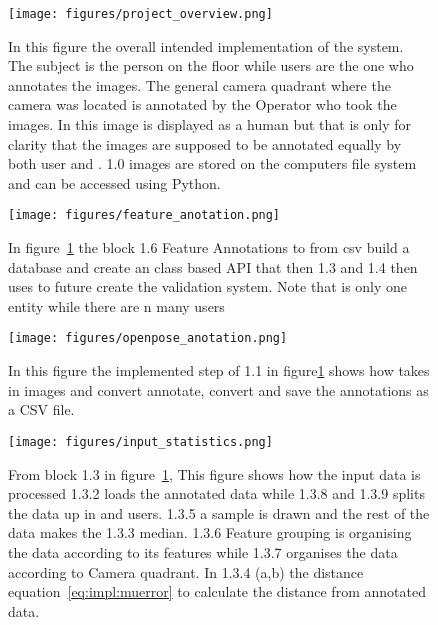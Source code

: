 \begin{figure}[ht]
\begin{center}
    \texttt{[image: figures/project\_overview.png]}
\end{center}
\caption[Project Overview]{In this figure the overall intended implementation of the system. The subject is the person on the floor while users are the one who annotates the images. The general camera quadrant where the camera was located is annotated by the Operator who took the images. In this image \openpose is displayed as a human but that is only for clarity that the images are supposed to be annotated equally by both user and \openpose. 1.0 images are stored on the computers file system and can be accessed using Python.}
\label{fig:project_overview}
\end{figure}


\begin{figure}[ht]
\begin{center}
    \texttt{[image: figures/feature\_anotation.png]}
\end{center}
\caption[1.6 feature anotations]{In figure~\ref{fig:project_overview} the block 1.6 Feature Annotations to from \ac{csv} build a database and create an class based API that then 1.3 and 1.4 then uses to future create the validation system. Note that \openpose{ } is only one entity while there are n many users}
\label{fig:1.6.feature_antotation}
\end{figure}



\begin{figure}[ht]
\begin{center}
    \texttt{[image: figures/openpose\_anotation.png]}
\end{center}
\caption[1.1 OpenPose anotations]{In this figure the implemented step of 1.1 in figure\ref{fig:project_overview} shows how \openpose takes in images and convert annotate, convert and save the annotations as a CSV file.}
\label{fig:1.1.openpose_anotation}
\end{figure}




\begin{figure}[ht]
\begin{center}
    \texttt{[image: figures/input\_statistics.png]}
\end{center}
\caption[1.3 Input statistics]{From block 1.3 in figure~\ref{fig:project_overview}, This figure shows how the input data is processed 1.3.2 loads the annotated data while 1.3.8 and 1.3.9 splits the data up in \openpose and users. 1.3.5 a sample is drawn and the rest of the data makes the 1.3.3 median. 1.3.6 Feature grouping is organising the data according to its features while 1.3.7 organises the data according to Camera quadrant. In 1.3.4 (a,b) the distance equation~\ref{eq:impl:muerror} to calculate the distance from annotated data.}
\label{fig:1.3_input_statistics}
\end{figure}

